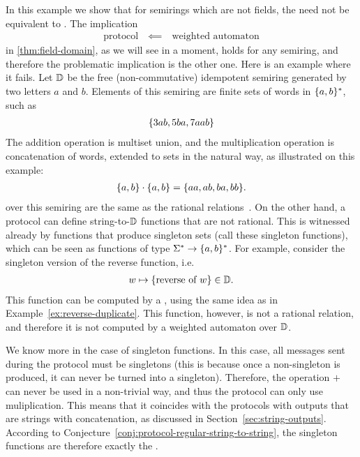 \begin{myexample}
    \label{ex:non-commutative-semirings} 
    In this example we show that for semirings which are not fields, the  need not be equivalent to . The implication 
    \begin{align*}
    \text{protocol} \quad \impliedby \quad \text{weighted automaton}
    \end{align*}
    in \cref{thm:field-domain}, as we will see in a moment, holds for any
    semiring, and therefore the problematic implication is the other one. Here
    is an example where it fails. Let $\mathbb D$ be  the free (non-commutative)
    idempotent semiring generated by two letters $a$ and $b$. Elements of this
    semiring are finite sets of words in $\{a,b\}^*$, such as 
    \begin{align*}
    \{3ab, 5ba, 7aab\}
    \end{align*}
    The addition operation is multiset union, 
    and the multiplication operation is concatenation of words, 
    extended to sets in the natural way, as illustrated on this example:
    \begin{align*}
    \{a,b\}\cdot \{a,b\} = \{aa, ab, ba, bb\}.
    \end{align*}
     over this semiring are the same as the 
    rational relations~\cite[Chapter IX]{Eilenberg74}. 
    On the other hand, a protocol can define string-to-$\mathbb D$ functions
    that are not rational. This is witnessed already by functions that produce 
    singleton sets (call these singleton functions), which can be seen as 
    functions of type $\Sigma^* \to \{a,b\}^*$. For example, consider 
    the singleton version of the  reverse function, i.e.
    \begin{align*}
    w \mapsto \{\text{reverse of $w$}\} \in \mathbb D.
    \end{align*}
    This function can be computed by a , using the same idea as in 
    Example~\ref{ex:reverse-duplicate}. This function, however, is not
    a rational relation, and therefore it is not computed by a weighted automaton over $\mathbb D$. 

    We know more in the case of singleton functions. In this case, all messages sent during the protocol must be singletons (this is because once a non-singleton is produced, it can never be turned into a singleton). Therefore, the operation $+$ can never be used in a non-trivial way, and thus the protocol can only use muliplication. This means that it coincides with the protocols with outputs that are strings with concatenation, as discussed in Section~\ref{sec:string-outputs}. According to Conjecture~\ref{conj:protocol-regular-string-to-string}, the singleton functions are therefore exactly the .
\end{myexample}

